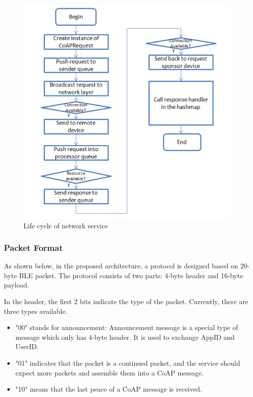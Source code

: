 \documentclass{Nan_Thesis}
\begin{document}
\begin{figure}[H]
  \centering 
      \includegraphics[scale=1]{pic/communicationlifecycle.png} 
  \caption{Life cycle of network service}
\end{figure}

\subsubsection{Packet Format}
As shown below, in the proposed architecture, a protocol is designed based on 20-byte BLE packet.  The protocol consists of two parts: 4-byte header and 16-byte payload. 

In the header, the first 2 bits indicate the type of the packet. Currently, there are three types available. 

\begin{itemize}
  \item "00" stands for announcement: Announcement message is a special type of message which only has 4-byte header. It is used to exchange AppID and UserID.
  \item "01" indicates that the packet is a continued packet, and the service should expect more packets and assemble them into a CoAP message.
  \item "10" means that the last peace of a CoAP message is received.     
\end{itemize}
\end{document}
